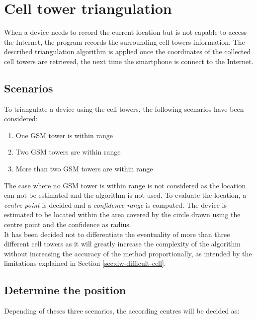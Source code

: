 \section{Cell tower triangulation}

\label{sec:dw-cell-triangu}



When a device needs to record the current location but is not capable to access the Internet, the program records the surrounding cell towers information.
The described triangulation algorithm is applied once the coordinates of the collected cell towers are retrieved, the next time the smartphone is connect to the Internet.

\subsection{Scenarios}

To triangulate a device using the cell towers, the following scenarios have been considered:

\begin{enumerate}
\item One GSM tower is within range
\item Two GSM towers are within range
\item More than two GSM towers are within range
\end{enumerate}

The case where no GSM tower is within range is not considered as the location can not be estimated and the algorithm is not used.
To evaluate the location, a \emph{centre point} is decided and a \emph{confidence range} is computed.
The device is estimated to be located within the area covered by the circle drawn using the centre point and the confidence as radius.\\

It has been decided not to differentiate the eventuality of more than three different cell towers as it will greatly increase the complexity of the algorithm without increasing the accuracy of the method proportionally, as intended by the limitations explained in Section \ref{sec:dw-difficult-cell}.

\subsection{Determine the position}

Depending of theses three scenarios, the according centres will be decided as:

